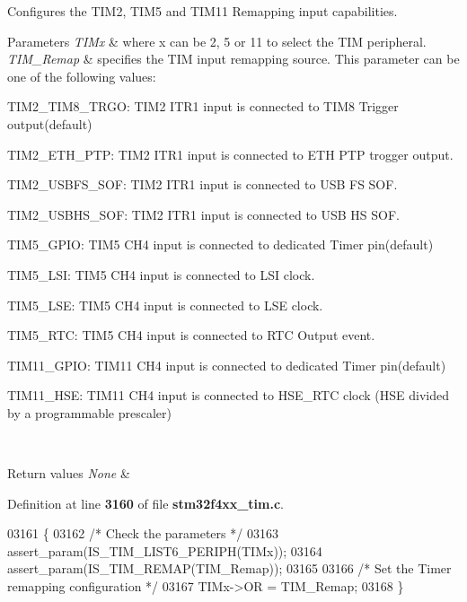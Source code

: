Configures the T\+I\+M2, T\+I\+M5 and T\+I\+M11 Remapping input capabilities. 


\begin{DoxyParams}{Parameters}
{\em T\+I\+Mx} & where x can be 2, 5 or 11 to select the T\+IM peripheral. \\
\hline
{\em T\+I\+M\+\_\+\+Remap} & specifies the T\+IM input remapping source. This parameter can be one of the following values\+: \begin{DoxyItemize}
\item T\+I\+M2\+\_\+\+T\+I\+M8\+\_\+\+T\+R\+GO\+: T\+I\+M2 I\+T\+R1 input is connected to T\+I\+M8 Trigger output(default) \item T\+I\+M2\+\_\+\+E\+T\+H\+\_\+\+P\+TP\+: T\+I\+M2 I\+T\+R1 input is connected to E\+TH P\+TP trogger output. \item T\+I\+M2\+\_\+\+U\+S\+B\+F\+S\+\_\+\+S\+OF\+: T\+I\+M2 I\+T\+R1 input is connected to U\+SB FS S\+OF. \item T\+I\+M2\+\_\+\+U\+S\+B\+H\+S\+\_\+\+S\+OF\+: T\+I\+M2 I\+T\+R1 input is connected to U\+SB HS S\+OF. \item T\+I\+M5\+\_\+\+G\+P\+IO\+: T\+I\+M5 C\+H4 input is connected to dedicated Timer pin(default) \item T\+I\+M5\+\_\+\+L\+SI\+: T\+I\+M5 C\+H4 input is connected to L\+SI clock. \item T\+I\+M5\+\_\+\+L\+SE\+: T\+I\+M5 C\+H4 input is connected to L\+SE clock. \item T\+I\+M5\+\_\+\+R\+TC\+: T\+I\+M5 C\+H4 input is connected to R\+TC Output event. \item T\+I\+M11\+\_\+\+G\+P\+IO\+: T\+I\+M11 C\+H4 input is connected to dedicated Timer pin(default) \item T\+I\+M11\+\_\+\+H\+SE\+: T\+I\+M11 C\+H4 input is connected to H\+S\+E\+\_\+\+R\+TC clock (H\+SE divided by a programmable prescaler) \end{DoxyItemize}
\\
\hline
\end{DoxyParams}

\begin{DoxyRetVals}{Return values}
{\em None} & \\
\hline
\end{DoxyRetVals}


Definition at line \textbf{ 3160} of file \textbf{ stm32f4xx\+\_\+tim.\+c}.


\begin{DoxyCode}
03161 \{
03162  \textcolor{comment}{/* Check the parameters */}
03163   assert_param(IS_TIM_LIST6_PERIPH(TIMx));
03164   assert_param(IS_TIM_REMAP(TIM\_Remap));
03165 
03166   \textcolor{comment}{/* Set the Timer remapping configuration */}
03167   TIMx->OR =  TIM\_Remap;
03168 \}
\end{DoxyCode}
